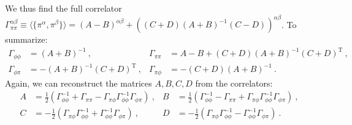 \documentclass[letter]{article}
\begin{document}
We thus find the full correlator $\Gamma^{\alpha\beta}_{\pi\pi} \equiv \langle \{ \pi^\alpha, \pi^\beta \} \rangle = (A - B)^{\alpha\beta} + ( (C+D)(A+B)^{-1}(C-D))^{\alpha\beta}$. To summarize:
\begin{align}
\Gamma_{\phi\phi} &= (A+B)^{-1}\ , & \Gamma_{\pi\pi} &= A-B + (C+D) (A+B)^{-1} (C+D)^\mathrm{T}\ , \nonumber\\
\Gamma_{\phi\pi} &= -(A+B)^{-1} (C+D)^\mathrm{T}\ , & \Gamma_{\pi\phi} &= - (C+D) (A+B)^{-1}\ .
\end{align}
Again, we can reconstruct the matrices $A,B,C,D$ from the correlators:
\begin{align}
A &= \frac{1}{2} \left( \Gamma_{\phi\phi}^{-1} + \Gamma_{\pi\pi} - \Gamma_{\pi\phi} \Gamma_{\phi\phi}^{-1} \Gamma_{\phi\pi} \right)\ , &
B &= \frac{1}{2} \left(  \Gamma_{\phi\phi}^{-1} - \Gamma_{\pi\pi} + \Gamma_{\pi\phi} \Gamma_{\phi\phi}^{-1} \Gamma_{\phi\pi}  \right)\ ,\nonumber\\
C &= -\frac{1}{2} \left( \Gamma_{\pi\phi} \Gamma_{\phi\phi}^{-1} + \Gamma_{\phi\phi}^{-1} \Gamma_{\phi\pi} \right)\ , &
D &=  -\frac{1}{2} \left( \Gamma_{\pi\phi} \Gamma_{\phi\phi}^{-1} - \Gamma_{\phi\phi}^{-1} \Gamma_{\phi\pi} \right)\ .
\end{align}
\end{document}
